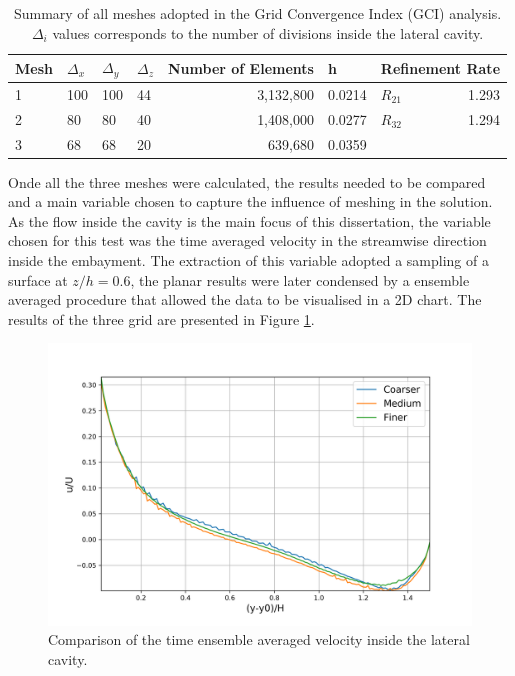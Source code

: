 \documentclass[../main.tex]{subfiles}
\begin{document}
\begin{table}[]
\centering
\caption{Summary of all meshes adopted in the Grid Convergence Index (GCI) analysis. $\Delta_i$ values corresponds to the number of divisions inside the lateral cavity.}
\label{tab:gci}
\begin{tabular}{llllrrlr}
Mesh & $\Delta_x$ & $\Delta_y$ & $\Delta_z$ & \multicolumn{1}{l}{Number of Elements} & \multicolumn{1}{l}{h} & \multicolumn{2}{l}{Refinement Rate} \\ \hline
1    & 100        & 100     & 44         & 3,132,800                              & 0.0214                & $R_{21}$   & 1.293                  \\
2    & 80         & 80         & 40         & 1,408,000                              & 0.0277                & $R_{32}$   & 1.294                  \\
3    & 68         & 68         & 20         & 639,680                                & 0.0359                &            & \multicolumn{1}{l}{}  
\end{tabular}
\end{table}

Onde all the three meshes were calculated, the results needed to be compared and a main variable chosen to capture the influence of meshing in the solution. As the flow inside the cavity is the main focus of this dissertation, the variable chosen for this test was the time averaged velocity in the streamwise direction inside the embayment. The extraction of this variable adopted a sampling of a surface at $z/h = 0.6$, the planar results were later condensed by a ensemble averaged procedure that allowed the data to be visualised in a 2D chart. The results of the three grid are presented in Figure \ref{fig:gciAllMeshes}.
\begin{figure}[!h]
\centering
\includegraphics[width=\linewidth]{../images/methods/gciAllMeshes.png}
\caption{Comparison of the time ensemble averaged velocity inside the lateral cavity.}
\label{fig:gciAllMeshes}
\end{figure}
\end{document}
